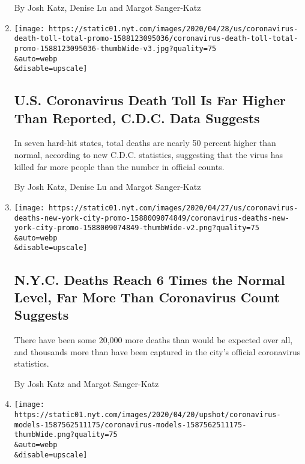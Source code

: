 \begin{enumerate}
  By Josh Katz, Denise Lu and Margot Sanger-Katz
\item
  \href{/interactive/2020/04/28/us/coronavirus-death-toll-total.html}{}

  \texttt{[image: https://static01.nyt.com/images/2020/04/28/us/coronavirus-death-toll-total-promo-1588123095036/coronavirus-death-toll-total-promo-1588123095036-thumbWide-v3.jpg?quality=75\\\&auto=webp\\\&disable=upscale]}

  \hypertarget{us-coronavirus-death-toll-is-far-higher-than-reported-cdc-data-suggests}{%
  \subsection{U.S. Coronavirus Death Toll Is Far Higher Than Reported,
  C.D.C. Data
  Suggests}\label{us-coronavirus-death-toll-is-far-higher-than-reported-cdc-data-suggests}}

  In seven hard-hit states, total deaths are nearly 50 percent higher
  than normal, according to new C.D.C. statistics, suggesting that the
  virus has killed far more people than the number in official counts.

  By Josh Katz, Denise Lu and Margot Sanger-Katz
\item
  \href{/interactive/2020/04/27/upshot/coronavirus-deaths-new-york-city.html}{}

  \texttt{[image: https://static01.nyt.com/images/2020/04/27/us/coronavirus-deaths-new-york-city-promo-1588009074849/coronavirus-deaths-new-york-city-promo-1588009074849-thumbWide-v2.png?quality=75\\\&auto=webp\\\&disable=upscale]}

  \hypertarget{nyc-deaths-reach-6-times-the-normal-level-far-more-than-coronavirus-count-suggests}{%
  \subsection{N.Y.C. Deaths Reach 6 Times the Normal Level, Far More
  Than Coronavirus Count
  Suggests}\label{nyc-deaths-reach-6-times-the-normal-level-far-more-than-coronavirus-count-suggests}}

  There have been some 20,000 more deaths than would be expected over
  all, and thousands more than have been captured in the city's official
  coronavirus statistics.

  By Josh Katz and Margot Sanger-Katz
\item
  \href{/interactive/2020/04/22/upshot/coronavirus-models.html}{}

  \texttt{[image: https://static01.nyt.com/images/2020/04/20/upshot/coronavirus-models-1587562511175/coronavirus-models-1587562511175-thumbWide.png?quality=75\\\&auto=webp\\\&disable=upscale]}


\end{enumerate}
